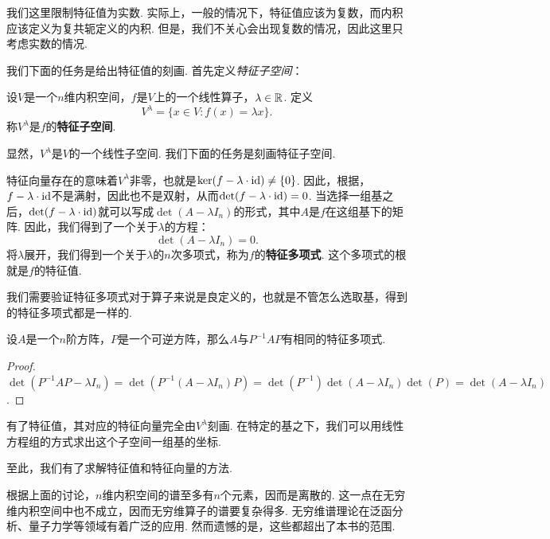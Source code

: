 我们这里限制特征值为实数. 实际上，一般的情况下，特征值应该为复数，而内积应该定义为复共轭定义的内积. 但是，我们不关心会出现复数的情况，因此这里只考虑实数的情况. 

我们下面的任务是给出特征值的刻画. 首先定义\textit{特征子空间}：

\begin{definition}[特征子空间]
设$V$是一个$n$维内积空间，$f$是$V$上的一个线性算子，$\lambda\in\mathbb{R}$. 定义
\[V^\lambda=\{x\in V:f(x)=\lambda x\}.\]
称$V^\lambda$是$f$的\textbf{特征子空间}. 
\end{definition}

显然，$V^\lambda$是$V$的一个线性子空间. 我们下面的任务是刻画特征子空间. 

特征向量存在的意味着$V^\lambda$非零，也就是$\ker(f-\lambda\cdot \mathrm{id})\neq\{0\}$. 因此，根据，$f-\lambda\cdot \mathrm{id}$不是满射，因此也不是双射，从而$\det(f-\lambda\cdot \mathrm{id})=0$. 当选择一组基之后，$\det(f-\lambda\cdot \mathrm{id})$就可以写成$\det(A-\lambda I_n)$的形式，其中$A$是$f$在这组基下的矩阵. 因此，我们得到了一个关于$\lambda$的方程：
\begin{equation}\label{eq:characteristic-equation}
    \det(A-\lambda I_n)=0.
\end{equation}
将$\lambda$展开，我们得到一个关于$\lambda$的$n$次多项式，称为$f$的\textbf{特征多项式}. 这个多项式的根就是$f$的特征值. 

我们需要验证特征多项式对于算子来说是良定义的，也就是不管怎么选取基，得到的特征多项式都是一样的.

\begin{proposition}\label{prop:similar-matrix-same-characteristic-polynomial}
    设$A$是一个$n$阶方阵，$P$是一个可逆方阵，那么$A$与$P^{-1}AP$有相同的特征多项式. 
\end{proposition}
\begin{proof}
    $\det(P^{-1}AP-\lambda I_n)=\det(P^{-1}(A-\lambda I_n)P)=\det(P^{-1})\det(A-\lambda I_n)\det(P)=\det(A-\lambda I_n)$.
\end{proof}

有了特征值，其对应的特征向量完全由$V^\lambda$刻画. 在特定的基之下，我们可以用线性方程组的方式求出这个子空间一组基的坐标. 

至此，我们有了求解特征值和特征向量的方法. 

\begin{remark}
根据上面的讨论，$n$维内积空间的谱至多有$n$个元素，因而是离散的. 这一点在无穷维内积空间中也不成立，因而无穷维算子的谱要复杂得多. 无穷维谱理论在泛函分析、量子力学等领域有着广泛的应用. 然而遗憾的是，这些都超出了本书的范围.
\end{remark}

